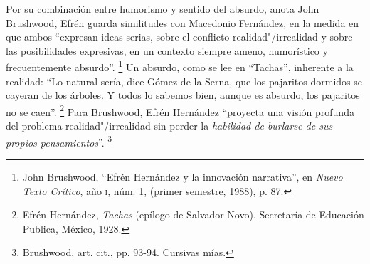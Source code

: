 \documentclass[14pt,twoside,final]{extbook} %
\let\oldfootnote\footnote
\renewcommand\footnote[1]{%
\oldfootnote{\hspace{1mm}#1}}
\begin{document}
Por su combinación entre humorismo y sentido del absurdo, anota John Brushwood, Efrén guarda similitudes con Macedonio Fernández, en la medida en que ambos ``expresan ideas serias, sobre el conflicto realidad"/irrealidad y sobre las posibilidades expresivas, en un contexto siempre ameno, humorístico y frecuentemente absurdo''.\footnote{John Brushwood, ``Efrén Hernández y la innovación narrativa'', en \emph{Nuevo Texto Crítico}, año \textsc{i}, núm. 1, (primer semestre, 1988), p. 87.} Un absurdo, como se lee en ``Tachas'', inherente a la realidad: ``Lo natural sería, dice Gómez de la Serna, que los pajaritos dormidos se cayeran de los árboles. Y todos lo sabemos bien, aunque es absurdo, los pajaritos no se caen''.\footnote{Efrén Hernández, \emph{Tachas} (epílogo de Salvador Novo). Secretaría de Educación Publica, México, 1928.} Para Brushwood, Efrén Hernández ``proyecta una visión profunda del problema realidad"/irrealidad sin perder la \emph{habilidad de burlarse de sus propios pensamientos}''.\footnote{Brushwood, art. cit., pp. 93-94. Cursivas mías.}
\end{document}
